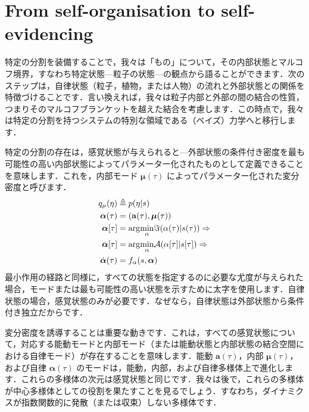 \documentclass[a4paper, titlepage]{jsarticle}
\begin{document}
\section{From self-organisation to self-evidencing}
特定の分割を装備することで，我々は「もの」について，その内部状態とマルコフ境界，すなわち特定状態—粒子の状態—の観点から語ることができます．次のステップは，自律状態（粒子，植物，または人物）の流れと外部状態との関係を特徴づけることです．言い換えれば，我々は粒子内部と外部の間の結合の性質，つまりそのマルコフブランケットを越えた結合を考慮します．この時点で，我々は特定の分割を持つシステムの特別な領域である（ベイズ）力学へと移行します．
\par
特定の分割の存在は，感覚状態が与えられると—外部状態の条件付き密度を最も可能性の高い内部状態によってパラメーター化されたものとして定義できることを意味します．これを，内部モード $\bm{\mu}(\tau)$ によってパラメーター化された変分密度と呼びます．
\begin{equation}\label{variational_density}
    \begin{aligned}
        q_{\mu}(\eta)&\triangleq p(\eta | s) \\
        \bm{\alpha}(\tau) &= (\mathbf{a}(\tau), \bm{\mu}(\tau)) \\
        \bm{\alpha}[\tau] &= \mathrm{arg}\underset{\alpha}{\operatorname{min}}\imaginary(\alpha(\tau) | s(\tau)) \Rightarrow \\
        \bm{\alpha}[\tau] &= \mathrm{arg}\underset{\alpha}{\operatorname{min}}\mathcal{A}(\alpha[\tau] |s[\tau]) \Rightarrow \\
        \dot{\bm{\alpha}}(\tau) &= f_\alpha(s, \bm{\alpha})
    \end{aligned}
\end{equation}
最小作用の経路と同様に，すべての状態を指定するのに必要な尤度が与えられた場合，モードまたは最も可能性の高い状態を示すために太字を使用します．自律状態の場合，感覚状態のみが必要です．なぜなら，自律状態は外部状態から条件付き独立だからです．
\par
変分密度を誘導することは重要な動きです．これは，すべての感覚状態について，対応する能動モードと内部モード（または能動状態と内部状態の結合空間における自律モード）が存在することを意味します．能動 $\mathbf{a}(\tau)$，内部 $\bm{\mu}(\tau)$，および自律 $\bm{\alpha}(\tau)$ のモードは，能動，内部，および自律多様体上で進化します．これらの多様体の次元は感覚状態と同じです．我々は後で，これらの多様体が中心多様体としての役割を果たすことを見るでしょう．すなわち，ダイナミクスが指数関数的に発散（または収束）しない多様体です．
\par
\end{document}

